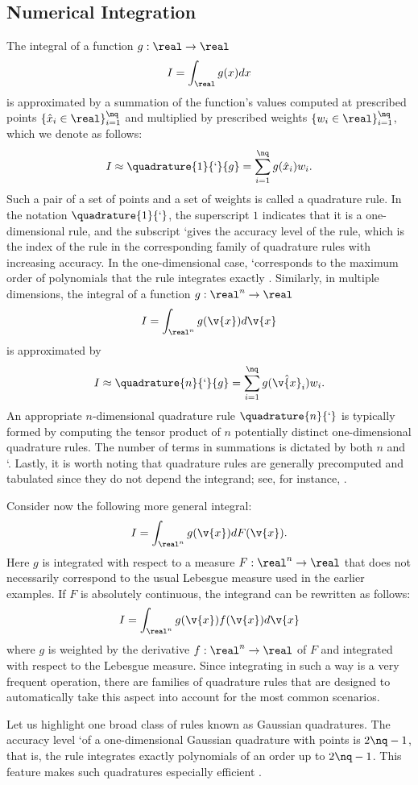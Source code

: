 \subsection{Numerical Integration}

The integral of a function $g: \real \to \real$
\[
  I = \int_\real g(x) dx
\]
is approximated by a summation of the function's values computed at prescribed
points $\{ \hat{x}_i \in \real \}_{i = 1}^\nq$ and multiplied by prescribed
weights $\{ w_i \in \real \}_{i = 1}^\nq$, which we denote as follows:
\[
  I \approx \quadrature{1}{\lq}{g} = \sum_{i = 1}^\nq g(\hat{x}_i) w_i.
\]
Such a pair of a set of points and a set of weights is called a quadrature rule.
In the notation $\quadrature{1}{\lq}$, the superscript $1$ indicates that it is
a one-dimensional rule, and the subscript \lq gives the accuracy level of the
rule, which is the index of the rule in the corresponding family of quadrature
rules with increasing accuracy. In the one-dimensional case, \lq corresponds to
the maximum order of polynomials that the rule integrates exactly
\cite{heiss2008}. Similarly, in multiple dimensions, the integral of a function
$g: \real^n \to \real$
\[
  I = \int_{\real^n} g(\v{x}) d\v{x}
\]
is approximated by
\[
  I \approx \quadrature{n}{\lq}{g} = \sum_{i = 1}^\nq g(\hat{\v{x}}_i) w_i.
\]
An appropriate $n$-dimensional quadrature rule $\quadrature{n}{\lq}$ is
typically formed by computing the tensor product of $n$ potentially distinct
one-dimensional quadrature rules. The number of terms \nq in summations is
dictated by both $n$ and \lq. Lastly, it is worth noting that quadrature rules
are generally precomputed and tabulated since they do not depend the integrand;
see, for instance, \cite{burkardt}.

Consider now the following more general integral:
\[
  I = \int_{\real^n} g(\v{x}) dF(\v{x}).
\]
Here $g$ is integrated with respect to a measure $F: \real^n \to \real$
\cite{durrett2010} that does not necessarily correspond to the usual Lebesgue
measure used in the earlier examples. If $F$ is absolutely continuous, the
integrand can be rewritten as follows:
\[
  I = \int_{\real^n} g(\v{x}) f(\v{x}) d\v{x}
\]
where $g$ is weighted by the derivative $f: \real^n \to \real$ of $F$ and
integrated with respect to the Lebesgue measure. Since integrating in such a way
is a very frequent operation, there are families of quadrature rules that are
designed to automatically take this aspect into account for the most common
scenarios.

Let us highlight one broad class of rules known as Gaussian quadratures. The
accuracy level \lq of a one-dimensional Gaussian quadrature with \nq points is
$2 \nq - 1$, that is, the rule integrates exactly polynomials of an order up to
$2 \nq - 1$. This feature makes such quadratures especially efficient
\cite{heiss2008}.

